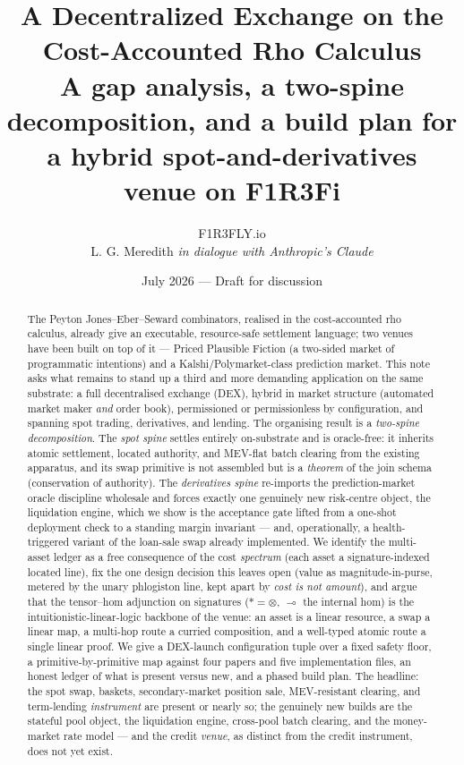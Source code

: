 \documentclass[11pt]{article}
\title{A Decentralized Exchange on the Cost-Accounted Rho Calculus\\[2pt]
\large A gap analysis, a two-spine decomposition, and a build plan for a hybrid
spot-and-derivatives venue on F1R3Fi}
\author{F1R3FLY.io \\ L. G. Meredith \quad\textit{in dialogue with Anthropic's Claude}}
\date{July 2026 --- Draft for discussion}
\theoremstyle{definition}
\newcommand{\tensorsig}{\ensuremath{\ast}}
\newcommand{\lolli}{\ensuremath{\multimap}}
\begin{document}
\maketitle

\begin{abstract}
The Peyton Jones--Eber--Seward combinators, realised in the cost-accounted rho calculus,
already give an executable, resource-safe settlement language; two venues have been built on
top of it --- Priced Plausible Fiction (a two-sided market of programmatic intentions) and a
Kalshi/Polymarket-class prediction market. This note asks what remains to stand up a third and
more demanding application on the same substrate: a full decentralised exchange (DEX), hybrid in
market structure (automated market maker \emph{and} order book), permissioned or permissionless
by configuration, and spanning spot trading, derivatives, and lending. The organising result is a
\emph{two-spine decomposition}. The \emph{spot spine} settles entirely on-substrate and is
oracle-free: it inherits atomic settlement, located authority, and MEV-flat batch clearing from
the existing apparatus, and its swap primitive is not assembled but is a \emph{theorem} of the
join schema (conservation of authority). The \emph{derivatives spine} re-imports the
prediction-market oracle discipline wholesale and forces exactly one genuinely new risk-centre
object, the liquidation engine, which we show is the acceptance gate lifted from a one-shot
deployment check to a standing margin invariant --- and, operationally, a health-triggered variant
of the loan-sale swap already implemented. We identify the multi-asset ledger as a free consequence
of the cost \emph{spectrum} (each asset a signature-indexed located line), fix the one design
decision this leaves open (value as magnitude-in-purse, metered by the unary phlogiston line, kept
apart by \emph{cost is not amount}), and argue that the tensor--hom adjunction on signatures
($\tensorsig = \otimes$, $\lolli$ the internal hom) is the intuitionistic-linear-logic backbone of
the venue: an asset is a linear resource, a swap a linear map, a multi-hop route a curried
composition, and a well-typed atomic route a single linear proof. We give a DEX-launch
configuration tuple over a fixed safety floor, a primitive-by-primitive map against four papers and
five implementation files, an honest ledger of what is present versus new, and a phased build plan.
The headline: the spot swap, baskets, secondary-market position sale, MEV-resistant clearing, and
term-lending \emph{instrument} are present or nearly so; the genuinely new builds are the stateful
pool object, the liquidation engine, cross-pool batch clearing, and the money-market rate model
--- and the credit \emph{venue}, as distinct from the credit instrument, does not yet exist.
\end{abstract}
\end{document}
